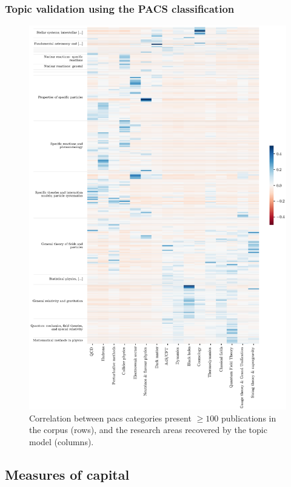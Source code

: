 \documentclass{article}
\begin{document}
\subsubsection{\label{appendix:pacs_validation}Topic validation using the PACS classification}


\begin{figure}[H]
    \centering
    \includegraphics[height=0.73\paperheight
]{plots/pacs_clustermap.eps}
    \caption{Correlation between \gls{pacs} categories present $\geq 100$ publications in the corpus (rows), and the research areas recovered by the topic model (columns).}
\end{figure}


\subsection{\label{appendix:capital_validation}Measures of capital}
\end{document}
